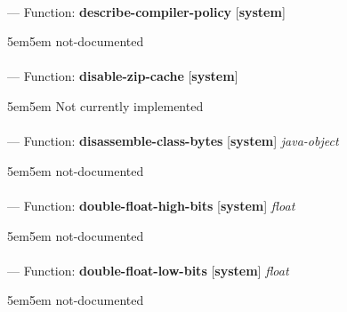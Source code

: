 \paragraph{}
\label{SYSTEM:DESCRIBE-COMPILER-POLICY}
--- Function: \textbf{describe-compiler-policy} [\textbf{system}] \textit{}

\begin{adjustwidth}{5em}{5em}
not-documented
\end{adjustwidth}

\paragraph{}
\label{SYSTEM:DISABLE-ZIP-CACHE}
--- Function: \textbf{disable-zip-cache} [\textbf{system}] \textit{}

\begin{adjustwidth}{5em}{5em}
Not currently implemented
\end{adjustwidth}

\paragraph{}
\label{SYSTEM:DISASSEMBLE-CLASS-BYTES}
--- Function: \textbf{disassemble-class-bytes} [\textbf{system}] \textit{java-object}

\begin{adjustwidth}{5em}{5em}
not-documented
\end{adjustwidth}

\paragraph{}
\label{SYSTEM:DOUBLE-FLOAT-HIGH-BITS}
--- Function: \textbf{double-float-high-bits} [\textbf{system}] \textit{float}

\begin{adjustwidth}{5em}{5em}
not-documented
\end{adjustwidth}

\paragraph{}
\label{SYSTEM:DOUBLE-FLOAT-LOW-BITS}
--- Function: \textbf{double-float-low-bits} [\textbf{system}] \textit{float}

\begin{adjustwidth}{5em}{5em}
not-documented
\end{adjustwidth}

